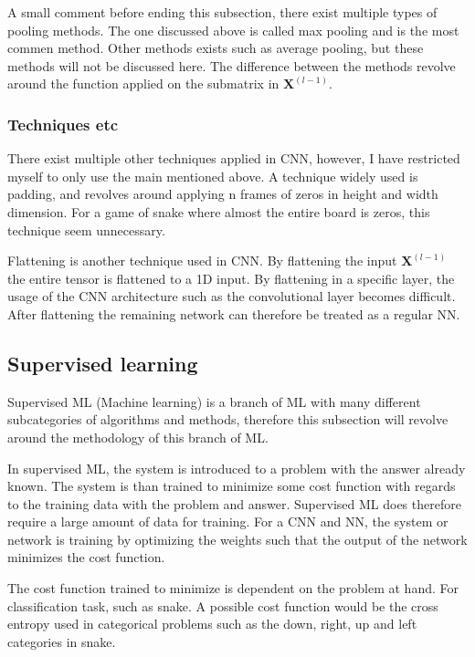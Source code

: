 \documentclass[%
 uio,
 jmp,
 amsmath,amssymb,
 reprint, nofootinbib]{revtex4-1}
\numberwithin{equation}{section}
\begin{document}
A small comment before ending this subsection, there exist multiple types of pooling methods. The one discussed above is called max pooling and is the most commen method. Other methods exists such as average pooling, but these methods will not be discussed here. The difference between the methods revolve around the function applied on the submatrix in \(\bm{X}^{(l-1)}\).

\subsubsection{Techniques etc}

There exist multiple other techniques applied in CNN, however, I have restricted myself to only use the main mentioned above. A technique widely used is padding, and revolves around applying n frames of zeros in height and width dimension. For a game of snake where almost the entire board is zeros, this technique seem unnecessary.

Flattening is another technique used in CNN. By flattening the input \(\bm{X}^{(l-1)}\) the entire tensor is flattened to a 1D input. By flattening in a specific layer, the usage of the CNN architecture such as the convolutional layer becomes difficult. After flattening the remaining network can therefore be treated as a regular NN. 

\subsection{Supervised learning}

Supervised ML (Machine learning) is a branch of ML with many different subcategories of algorithms and methods, therefore this subsection will revolve around the methodology of this branch of ML.

In supervised ML, the system is introduced to a problem with the answer already known. The system is than trained to minimize some cost function with regards to the training data with the problem and answer. Supervised ML does therefore require a large amount of data for training. For a CNN and NN, the system or network is training by optimizing the weights such that the output of the network minimizes the cost function.

The cost function trained to minimize is dependent on the problem at hand. For classification task, such as snake. A possible cost function would be the cross entropy used in categorical problems such as the down, right, up and left categories in snake.
\end{document}
